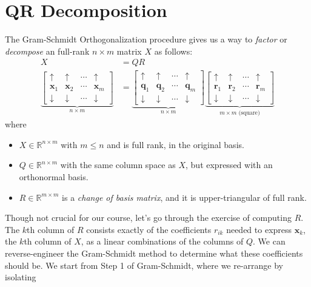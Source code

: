 \documentclass[12pt, a4paper]{article}
\theoremstyle{definition}
\begin{document}
	\section*{QR Decomposition}
	The Gram-Schmidt Orthogonalization procedure gives us a way to \textit{factor}
	or \textit{decompose} an full-rank $n\times m$ matrix $X$ as follows:
	\begin{align*}
		X&=QR\\
		\underbrace{
		\begin{bmatrix}
			\uparrow & \uparrow & \cdots & \uparrow\\
			\mathbf{x}_1 & \mathbf{x}_2 & \cdots & \mathbf{x}_m\\
			\downarrow & \downarrow & \cdots & \downarrow
		\end{bmatrix}
		}_{n\times m}
		&=
		\underbrace{
		\begin{bmatrix}
			\uparrow & \uparrow & \cdots & \uparrow\\
			\mathbf{q}_1 & \mathbf{q}_2 & \cdots & \mathbf{q}_m\\
			\downarrow & \downarrow & \cdots & \downarrow
		\end{bmatrix}
		}_{n\times m}
		\underbrace{
		\begin{bmatrix}
			\uparrow & \uparrow & \cdots & \uparrow\\
			\mathbf{r}_1 & \mathbf{r}_2 & \cdots & \mathbf{r}_m\\
			\downarrow & \downarrow & \cdots & \downarrow
		\end{bmatrix}
		}_{m\times m \text{ (square)}}
	\end{align*}
	where
	\begin{itemize}
		\item $X\in\mathbb{R}^{n\times m}$ with $m\leq n$ and is full rank,
		in the original basis.
		\item $Q\in\mathbb{R}^{n\times m}$ with the same column space as $X$,
		but expressed with an orthonormal basis.
		\item $R\in\mathbb{R}^{m\times m}$ is a \textit{change of basis matrix},
		and it is upper-triangular of full rank.
	\end{itemize}
	Though not crucial for our course, let's go through the exercise of computing $R$.
	The $k$th column of $R$ consists exactly of the coefficients $r_{ik}$ needed
	to express $\mathbf{x}_k$, the $k$th column of $X$, as a linear combinations of
	the columns of $Q$. We can reverse-engineer the Gram-Schmidt method to determine
	what these coefficients should be.
	We start from Step 1 of Gram-Schmidt, where we re-arrange by isolating
\end{document}
